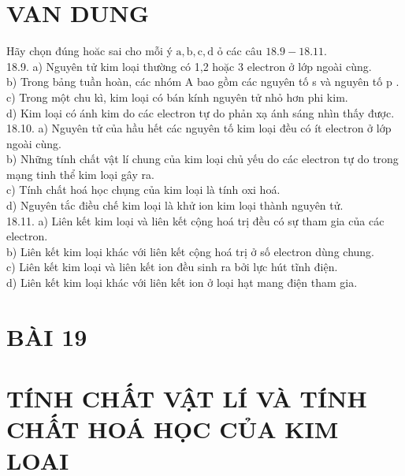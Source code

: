 \documentclass[10pt]{article}
\begin{document}
\section*{VAN DUNG}
Hãy chọn đúng hoăc sai cho mỗi ý $\mathrm{a}, \mathrm{b}, \mathrm{c}, \mathrm{d}$ ỏ các câu $18.9-18.11$.\\
18.9. a) Nguyên tử kim loại thường có 1,2 hoặc 3 electron ở lớp ngoài cùng.\\
b) Trong bảng tuần hoàn, các nhóm A bao gồm các nguyên tố s và nguyên tố p .\\
c) Trong một chu kì, kim loại có bán kính nguyên tử nhỏ hơn phi kim.\\
d) Kim loại có ánh kim do các electron tự do phản xạ ánh sáng nhìn thấy được.\\
18.10. a) Nguyên tử của hầu hết các nguyên tố kim loại đều có ít electron ở lớp ngoài cùng.\\
b) Những tính chất vật lí chung của kim loại chủ yếu do các electron tự do trong mạng tinh thể kim loại gây ra.\\
c) Tính chất hoá học chụng của kim loại là tính oxi hoá.\\
d) Nguyên tắc điều chế kim loại là khử ion kim loại thành nguyên tử.\\
18.11. a) Liên kết kim loại và liên kết cộng hoá trị đều có sự tham gia của các electron.\\
b) Liên kết kim loại khác với liên kết cộng hoá trị ở số electron dùng chung.\\
c) Liên kết kim loại và liên kết ion đều sinh ra bởi lực hút tĩnh điện.\\
d) Liên kết kim loại khác với liên kết ion ở loại hạt mang điện tham gia.

\section*{BÀI 19}
\section*{TÍNH CHẤT VẬT LÍ VÀ TÍNH CHẤT HOÁ HỌC CỦA KIM LOAI}
\end{document}
